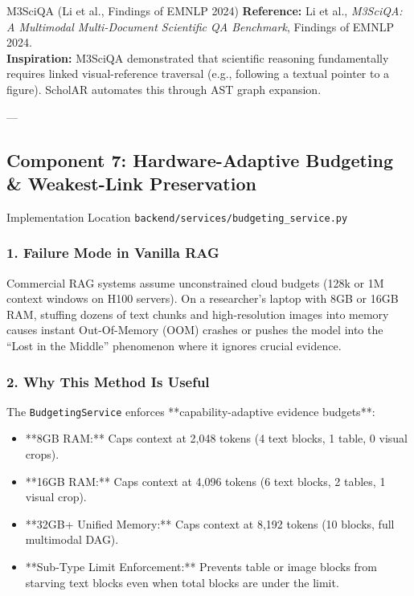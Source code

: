 \documentclass[11pt,a4paper]{article}
\begin{document}
\begin{inspirationbox}{M3SciQA (Li et al., Findings of EMNLP 2024)}
\textbf{Reference:} Li et al., \emph{M3SciQA: A Multimodal Multi-Document Scientific QA Benchmark}, Findings of EMNLP 2024.\\
\textbf{Inspiration:} M3SciQA demonstrated that scientific reasoning fundamentally requires linked visual-reference traversal (e.g., following a textual pointer to a figure). ScholAR automates this through AST graph expansion.
\end{inspirationbox}

---

\subsection{Component 7: Hardware-Adaptive Budgeting \& Weakest-Link Preservation}
\begin{codebox}{Implementation Location}
\texttt{backend/services/budgeting\_service.py}
\end{codebox}

\subsubsection{1. Failure Mode in Vanilla RAG}
Commercial RAG systems assume unconstrained cloud budgets (128k or 1M context windows on H100 servers). On a researcher's laptop with 8GB or 16GB RAM, stuffing dozens of text chunks and high-resolution images into memory causes instant Out-Of-Memory (OOM) crashes or pushes the model into the ``Lost in the Middle'' phenomenon where it ignores crucial evidence.

\subsubsection{2. Why This Method Is Useful}
The \texttt{BudgetingService} enforces **capability-adaptive evidence budgets**:
\begin{itemize}[leftmargin=*]
    \item **8GB RAM:** Caps context at 2,048 tokens (4 text blocks, 1 table, 0 visual crops).
    \item **16GB RAM:** Caps context at 4,096 tokens (6 text blocks, 2 tables, 1 visual crop).
    \item **32GB+ Unified Memory:** Caps context at 8,192 tokens (10 blocks, full multimodal DAG).
    \item **Sub-Type Limit Enforcement:** Prevents table or image blocks from starving text blocks even when total blocks are under the limit.
\end{itemize}
\end{document}
